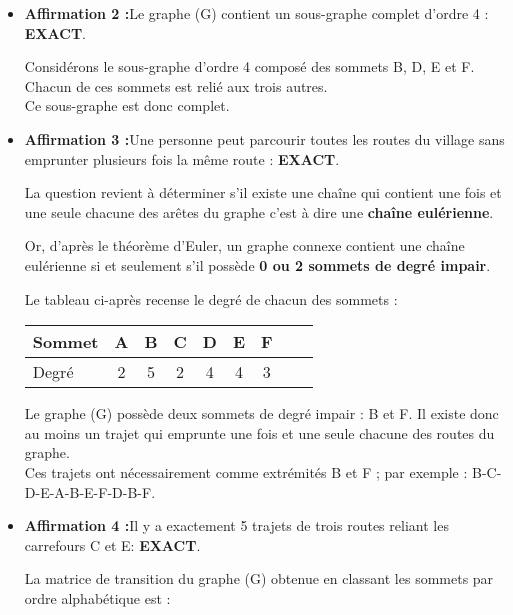 {\begin{corrige}
\begin{itemize}
          C'est bien le cas ici donc le graphe (G) est connexe.
          \item %
          \textbf{Affirmation 2 :}\quad Le graphe (G) contient un sous-graphe complet d'ordre 4 : \textbf{EXACT}.
          \par
          Considérons le sous-graphe d'ordre 4 composé des sommets B, D, E et F. Chacun de ces sommets est relié aux trois autres.\\
          Ce sous-graphe est donc complet.
          \item %
          \textbf{Affirmation 3 :}\quad Une personne peut parcourir toutes les routes du village sans emprunter plusieurs fois la même route : \textbf{EXACT}.
          \par
          La question revient à déterminer s'il existe une chaîne qui contient une fois et une seule chacune des arêtes du graphe c'est à dire une \textbf{chaîne eulérienne}.
          \par
          Or, d'après le théorème d'Euler, un graphe connexe contient une chaîne eulérienne si et seulement s'il possède \textbf{0 ou 2 sommets de degré impair}.
          \par
          Le tableau ci-après recense le degré de chacun des sommets :
          \par
          \begin{center}
               \begin{tabular}{|l|c|c|c|c|c|c|c|c|}%
                    \hline
                    Sommet & A & B & C & D & E & F  \\
                    \hline
                    Degré & 2 & 5 & 2 & 4 & 4 & 3 \\
                    \hline
               \end{tabular}
          \end{center}
          \par
          Le graphe (G) possède deux sommets de degré impair : B et F. Il existe donc au moins un trajet qui emprunte une fois et une seule chacune des routes du graphe.\\
          Ces trajets ont nécessairement comme extrémités B et F ; par exemple : B-C-D-E-A-B-E-F-D-B-F.
          \item %
          \textbf{Affirmation 4 :}\quad Il y a exactement 5 trajets de trois routes reliant les carrefours C et E: \textbf{EXACT}.
          \par
          La matrice de transition du graphe (G) obtenue en classant les sommets par ordre alphabétique est :

\end{itemize}
\end{corrige}}
